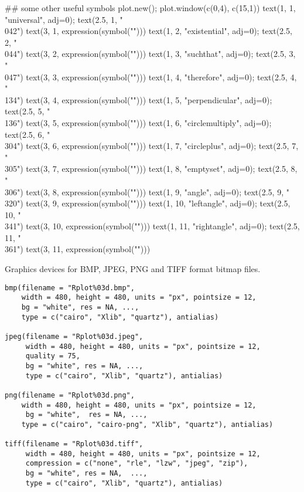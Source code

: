 \begin{Examples}
\begin{ExampleCode}
## some other useful symbols
plot.new(); plot.window(c(0,4), c(15,1))
text(1, 1, "universal", adj=0); text(2.5, 1,  "\\042")
text(3, 1, expression(symbol("")))
text(1, 2, "existential", adj=0); text(2.5, 2,  "\\044")
text(3, 2, expression(symbol("")))
text(1, 3, "suchthat", adj=0); text(2.5, 3,  "\\047")
text(3, 3, expression(symbol("")))
text(1, 4, "therefore", adj=0); text(2.5, 4,  "\\134")
text(3, 4, expression(symbol("")))
text(1, 5, "perpendicular", adj=0); text(2.5, 5,  "\\136")
text(3, 5, expression(symbol("")))
text(1, 6, "circlemultiply", adj=0); text(2.5, 6,  "\\304")
text(3, 6, expression(symbol("")))
text(1, 7, "circleplus", adj=0); text(2.5, 7,  "\\305")
text(3, 7, expression(symbol("")))
text(1, 8, "emptyset", adj=0); text(2.5, 8,  "\\306")
text(3, 8, expression(symbol("")))
text(1, 9, "angle", adj=0); text(2.5, 9,  "\\320")
text(3, 9, expression(symbol("")))
text(1, 10, "leftangle", adj=0); text(2.5, 10,  "\\341")
text(3, 10, expression(symbol("")))
text(1, 11, "rightangle", adj=0); text(2.5, 11,  "\\361")
text(3, 11, expression(symbol("")))
\end{ExampleCode}
\end{Examples}
%
\begin{Description}\relax
Graphics devices for BMP, JPEG, PNG and TIFF format bitmap files.
\end{Description}
%
\begin{Usage}
\begin{verbatim}
bmp(filename = "Rplot%03d.bmp",
    width = 480, height = 480, units = "px", pointsize = 12,
    bg = "white", res = NA, ...,
    type = c("cairo", "Xlib", "quartz"), antialias)

jpeg(filename = "Rplot%03d.jpeg",
     width = 480, height = 480, units = "px", pointsize = 12,
     quality = 75,
     bg = "white", res = NA, ...,
     type = c("cairo", "Xlib", "quartz"), antialias)

png(filename = "Rplot%03d.png",
    width = 480, height = 480, units = "px", pointsize = 12,
     bg = "white",  res = NA, ...,
    type = c("cairo", "cairo-png", "Xlib", "quartz"), antialias)

tiff(filename = "Rplot%03d.tiff",
     width = 480, height = 480, units = "px", pointsize = 12,
     compression = c("none", "rle", "lzw", "jpeg", "zip"),
     bg = "white", res = NA,  ...,
     type = c("cairo", "Xlib", "quartz"), antialias)
\end{verbatim}
\end{Usage}
